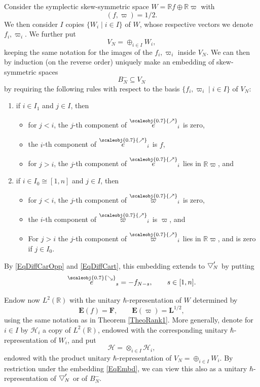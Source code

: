 \documentclass[11pt, reqno]{amsart}
\theoremstyle{definition}
\numberwithin{equation}{section}
\def\Hc{\mathcal H}
\def\R{\mathbb R}
\newcommand{\eb}{\mathbf{E}}
\newcommand{\Bor}{B}
\newcommand{\nears}{\scaleobj{0.7}{\nearrow}}
\newcommand{\sears}{\scaleobj{0.7}{\searrow}}
\newcommand{\nee}{\overset{\nears}{e}}
\newcommand{\seee}{\overset{\sears}{e}}
\newcommand{\nevarpi}{\overset{\nears}{\varpi}}
\newcommand{\Lb}{\mathbf{L}}
\newcommand{\wbtd}[1]{\raisebox{\depth}{$\bigtriangledown'$\!\!}_{#1}}
\newcommand{\wwbtd}[1]{\Bor^-_{#1}}
\def\stgF{\mathbf{F}}
\begin{document}
Consider the symplectic skew-symmetric space $W = \R f \oplus \R \varpi$ with
\begin{equation}\label{EqNormalisationfw}
(f,\varpi) = 1/2.
\end{equation}
We then consider $I$ copies $\{W_i\mid i \in I\}$ of $W$, whose respective vectors we denote $f_i,\varpi_i$. We further put
\begin{equation}\label{EqDirSum}
V_N = \oplus_{i\in I} W_i,
\end{equation}
keeping the same notation for the images of the $f_i,\varpi_i$ inside $V_N$. We can then by induction (on the reverse order) uniquely make an embedding of skew-symmetric spaces
\begin{equation}\label{EqEmbd}
\wwbtd{N} \subseteq V_N
\end{equation}
by requiring the following rules with respect to the basis $\{f_i,\varpi_i \mid i \in I\}$ of $V_N$:
\begin{enumerate}
\item if $i\in I_1$ and $j\in I$, then 
\begin{itemize}
\item for $j<i$, the $j$-th component of $\nee_i$ is zero, 
\item the $i$-th component of $\nee_i$ is $f$,
\item for $j>i$, the $j$-th component of $\nee_i$ lies in $\R \varpi$, and 
\end{itemize}
\item if $i\in I_0 \cong [1,n]$ and $j \in I$, then 
\begin{itemize}
\item for $j<i$, the $j$-th component of $\nevarpi_i$ is zero,
\item the $i$-th component of $\nevarpi_i$ is $\varpi$, and 
\item For $j>i$ the $j$-th component of $\nevarpi_i$ lies in $\R \varpi$, and is zero if $j \in I_0$.
\end{itemize}
\end{enumerate}
By \eqref{EqDiffCarOpp} and \eqref{EqDiffCart}, this embedding extends to $\wbtd{N}$ by putting
\begin{equation}\label{EqExtToTr}
\seee_{s} = -f_{N-s},\qquad s\in [1,n]. 
\end{equation}


Endow now $L^2(\R)$ with the unitary $\hbar$-representation of $W$ determined by 
\[
\eb(f) = \stgF,\qquad \eb(\varpi) = \Lb^{1/2},
\]
using the same notation as in Theorem \ref{TheoRank1}.  More generally, denote for $i\in I$ by $\Hc_i$ a copy of $L^2(\R)$, endowed with the corresponding unitary $\hbar$-representation of $W_i$,  and put 
\begin{equation}\label{EqTensProd}
\Hc = \otimes_{i\in I} \Hc_i,
\end{equation}
endowed with the product unitary $\hbar$-representation of $V_N = \oplus_{i\in I}W_i$. By restriction under the embedding \eqref{EqEmbd}, we can view this also as a unitary $\hbar$-representation of $\wbtd{N}$ or of $\wwbtd{N}$. 
  
\end{document}
